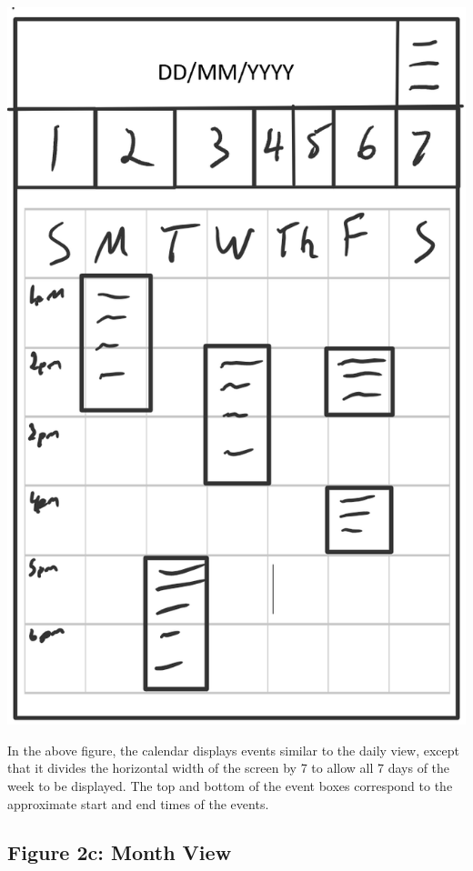 \documentclass{scrreprt}
\begin{document}
\begin{center}
\includegraphics{week.PNG}
\end{center}

In the above figure, the calendar displays events similar to the daily view, except that it divides the horizontal width of the screen by 7 to allow all 7 days of the week to be displayed.  The top and bottom of the event boxes correspond to the approximate start and end times of the events.

\subsection{Figure 2c: Month View}
\end{document}
